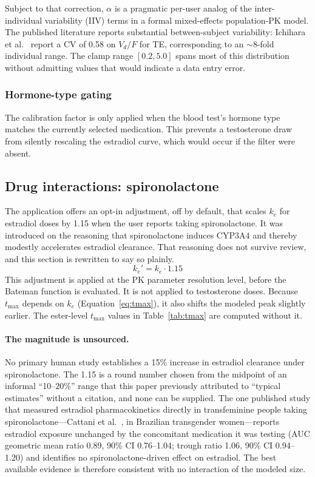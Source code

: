 \documentclass[11pt,a4paper]{article}
\begin{document}
Subject to that correction, $\alpha$ is a pragmatic per-user
analog of the inter-individual variability (IIV) terms in a formal
mixed-effects population-PK model. The published literature reports
substantial between-subject variability: Ichihara et al.~\cite{ichihara2020}
report a CV of 0.58 on $V_d/F$ for TE, corresponding to an $\sim$8-fold
individual range. The clamp range $[0.2, 5.0]$ spans most of this
distribution without admitting values that would indicate a data entry
error.

\subsubsection{Hormone-type gating}

The calibration factor is only applied when the blood test's hormone
type matches the currently selected medication. This prevents a
testosterone draw from silently rescaling the estradiol curve, which
would occur if the filter were absent.

\subsection{Drug interactions: spironolactone}
\label{sec:spiro}

The application offers an opt-in adjustment, off by default, that scales
$k_e$ for estradiol doses by 1.15 when the user reports taking
spironolactone. It was introduced on the reasoning that spironolactone
induces CYP3A4 and thereby modestly accelerates estradiol clearance. That
reasoning does not survive review, and this section is rewritten to say so
plainly.
\begin{equation}
k_e' = k_e \cdot 1.15
\label{eq:spiro}
\end{equation}
This adjustment is applied at the PK parameter resolution level, before
the Bateman function is evaluated. It is not applied to testosterone
doses. Because $t_{\max}$ depends on $k_e$ (Equation~\ref{eq:tmax}), it also
shifts the modeled peak slightly earlier. The ester-level $t_{\max}$ values
in Table~\ref{tab:tmax} are computed without it.

\paragraph{The magnitude is unsourced.} No primary human study establishes a
15\% increase in estradiol clearance under spironolactone. The 1.15 is a
round number chosen from the midpoint of an informal ``10--20\%'' range that
this paper previously attributed to ``typical estimates'' without a
citation, and none can be supplied. The one published study that measured
estradiol pharmacokinetics directly in transfeminine people taking
spironolactone---Cattani et al.~\cite{cattani2023}, in Brazilian transgender
women---reports estradiol exposure unchanged by the concomitant medication
it was testing (AUC geometric mean ratio 0.89, 90\% CI 0.76--1.04; trough
ratio 1.06, 90\% CI 0.94--1.20) and identifies no spironolactone-driven
effect on estradiol. The best available evidence is therefore consistent
with no interaction of the modeled size.
\end{document}

